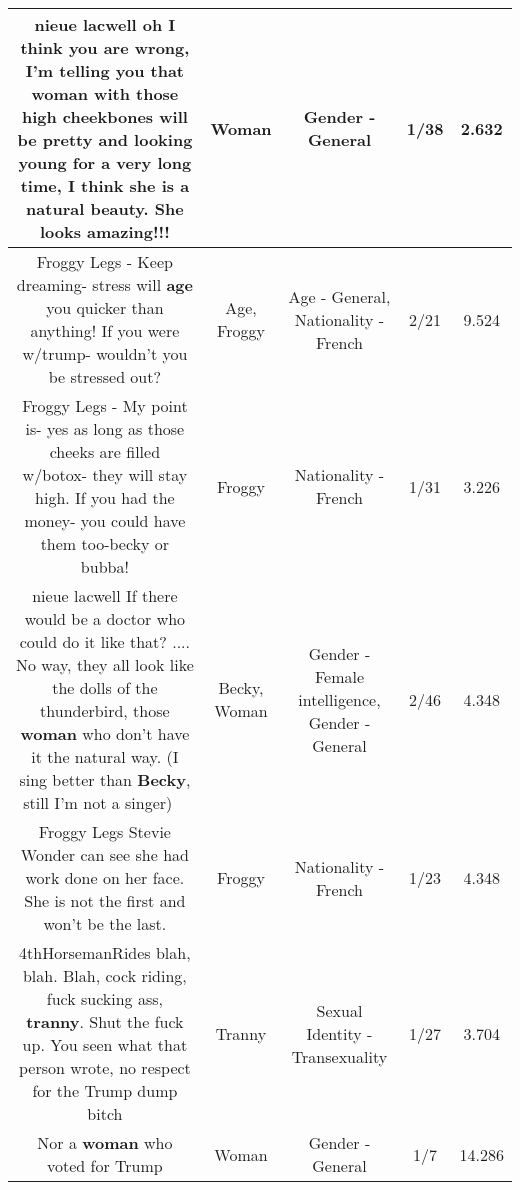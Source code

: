 \documentclass[11pt]{article}
\newlength\mylength
\begin{document}
\begin{center}
\begin{longtable}{|C{.65\mylength}|C{.30\mylength}|C{.12\mylength}|C{.12\mylength}|C{.12\mylength}|}
  \small nieue lacwell  oh I think you are wrong, I'm telling you that \textbf{woman} with those high cheekbones will be pretty and looking young for a very long time, I think she is a natural beauty. She looks amazing!!!\normalsize   & Woman & Gender - General & 1/38 & 2.632 \\  \hline
  \small Froggy Legs - Keep dreaming- stress will \textbf{age} you quicker than anything! If you were w/trump- wouldn't you be stressed out?\normalsize   & Age, Froggy & Age - General, Nationality - French & 2/21 & 9.524 \\  \hline
  \small Froggy Legs - My point is- yes as long as those cheeks are filled w/botox- they will stay high. If you had the money- you could have them too-becky or bubba!\normalsize   & Froggy & Nationality - French & 1/31 & 3.226 \\  \hline
  \small nieue lacwell If there would be a doctor who could do it like that? ....  No way, they all look like the dolls of the thunderbird, those \textbf{woman} who don't have it the natural way. (I sing better than \textbf{Becky}, still I'm not a singer) 🎵🎼\normalsize   & Becky, Woman & Gender - Female intelligence, Gender - General & 2/46 & 4.348 \\  \hline
  \small Froggy Legs Stevie Wonder can see she had work done on her face. She is not the first and won't be the last.\normalsize   & Froggy & Nationality - French & 1/23 & 4.348 \\  \hline
  \small \@4thHorsemanRides blah, blah. Blah, cock riding, fuck sucking ass, \textbf{tranny}. Shut the fuck up. You seen what that person wrote,  no respect for the Trump dump bitch\normalsize   & Tranny & Sexual Identity - Transexuality & 1/27 & 3.704 \\  \hline
  \small Nor a \textbf{woman} who voted for Trump\normalsize   & Woman & Gender - General & 1/7 & 14.286 \\  \hline

\end{longtable}
\end{center}
\end{document}
